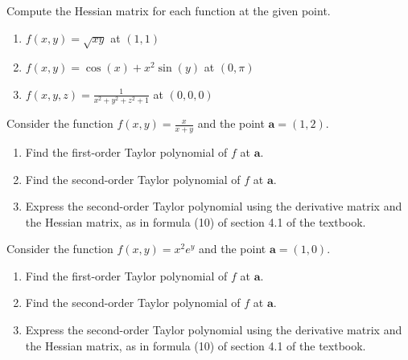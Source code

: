 \documentclass{ximera}
\begin{document}
\begin{problem}
Compute the Hessian matrix for each function at the given point.

\begin{enumerate}

\item $f(x,y) = \sqrt{xy}$ at $(1,1)$

\item $f(x,y) = \cos(x) + x^2\sin(y)$ at $(0, \pi)$

\item $f(x,y,z) = \frac{1}{x^2+y^2+z^2+1}$ at $(0,0,0)$
\end{enumerate}
\end{problem}

\begin{problem}
Consider the function $f(x,y) = \frac{x}{x+y}$ and the point $\mathbf{a}=(1,2)$.
\begin{enumerate}
\item Find the first-order Taylor polynomial of $f$ at $\mathbf{a}$.
\item Find the second-order Taylor polynomial of $f$ at $\mathbf{a}$.
\item Express the second-order Taylor polynomial using the derivative matrix and the Hessian matrix, as in formula (10) of section 4.1 of the textbook.
\end{enumerate}
\end{problem}

\begin{problem}
Consider the function $f(x,y) = x^2e^{y}$ and the point $\mathbf{a}=(1,0)$.
\begin{enumerate}
\item Find the first-order Taylor polynomial of $f$ at $\mathbf{a}$.
\item Find the second-order Taylor polynomial of $f$ at $\mathbf{a}$.
\item Express the second-order Taylor polynomial using the derivative matrix and the Hessian matrix, as in formula (10) of section 4.1 of the textbook.
\end{enumerate}
\end{problem}
\end{document}
